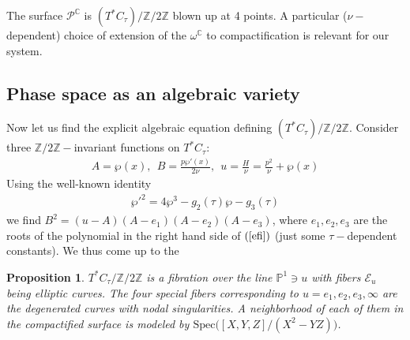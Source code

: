 \documentclass[12pt]{article}
\newtheorem{pr}{Proposition}[section]
\numberwithin{equation}{section}
\theoremstyle{definition}
\begin{document}
The surface $\mathcal{P}^{\mathbb{C}}$ is $(T^{*}C_{\tau}) \big/ \mathbb{Z}/2\mathbb{Z}$ blown up at 4 points. A particular ($\nu-$dependent) choice of extension of the $\omega^{\mathbb{C}}$ to compactification is relevant for our system.
\subsection{Phase space as an algebraic variety}
Now let us find the explicit algebraic equation defining $(T^{*}C_{\tau})\big/ \mathbb{Z}/2\mathbb{Z}$. Consider three $\mathbb{Z}/2\mathbb{Z}-$invariant functions on $T^{*}C_{\tau}$:
\begin{align*}
    A = \wp(x), ~~ B = \frac{p \wp'(x)}{2 \nu}, ~~ u = \frac{H}{\nu} = \frac{p^2}{\nu} + \wp(x)
\end{align*}
Using the well-known identity
\begin{align}\label{efi}
    \wp'^2 = 4 \wp^3 - g_2(\tau) \wp - g_3 (\tau)
\end{align}
we find $B^2 = (u - A)(A - e_1)(A - e_2)(A - e_3)$, where $e_1, e_2, e_3$ are the roots of the polynomial in the right hand side of $(\ref{efi})$ (just some $\tau-$dependent constants).
We thus come up to the
\begin{pr}
    $T^{*}C_{\tau} \big/ \mathbb{Z}/2\mathbb{Z}$ is a fibration over the line $\mathbb{P}^1 \ni u$ with fibers $\mathcal{E}_{u}$ being elliptic curves. The four special fibers corresponding to $u = e_1, e_2, e_3, \infty$ are the degenerated curves with nodal singularities. A neighborhood of each of them in the compactified surface is modeled by $\mathrm{Spec}\big( [X, Y, Z]/(X^2 - YZ) \big)$.
\end{pr}
\end{document}
